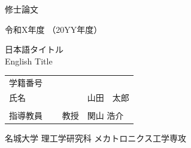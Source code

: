 %
%
%

\begin{titlepage}
\begin{center}
{\Large 修士論文} \\
\vspace*{15mm}

{\Large 令和X年度 （20YY年度）} \\
\vspace*{35mm}

{\LARGE %
日本語タイトル
\\[10mm]
English Title}

\vfill

{\Large
\begin{tabular}{lcl}
	{学籍番号} &  & {} \\
	{氏名} &  & {山田　太郎} \\
	\\
	指導教員 \ \ & 教授 & 関山 浩介 \\
	\end{tabular}
}

\vfill

{\Large
名城大学 理工学研究科 メカトロニクス工学専攻
}
\end{center}
\end{titlepage}